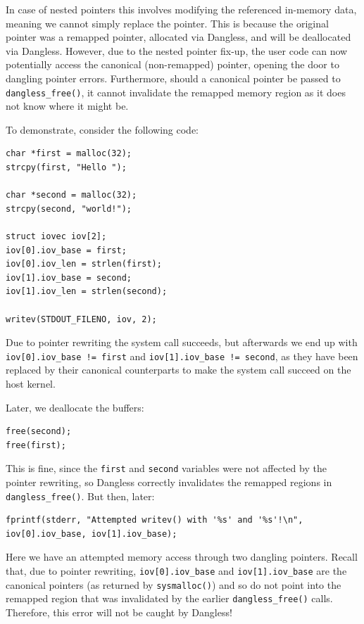 In case of nested pointers this involves modifying the referenced in-memory data, meaning we cannot simply replace the pointer. This is because the original pointer was a remapped pointer, allocated via Dangless, and will be deallocated via Dangless. However, due to the nested pointer fix-up, the user code can now potentially access the canonical (non-remapped) pointer, opening the door to dangling pointer errors. Furthermore, should a canonical pointer be passed to \lstinline!dangless_free()!, it cannot invalidate the remapped memory region as it does not know where it might be.

To demonstrate, consider the following code:

\begin{lstlisting}
char *first = malloc(32);
strcpy(first, "Hello ");

char *second = malloc(32);
strcpy(second, "world!");

struct iovec iov[2];
iov[0].iov_base = first;
iov[0].iov_len = strlen(first);
iov[1].iov_base = second;
iov[1].iov_len = strlen(second);

writev(STDOUT_FILENO, iov, 2);
\end{lstlisting}

Due to pointer rewriting the system call succeeds, but afterwards we end up with \lstinline|iov[0].iov_base != first| and \lstinline|iov[1].iov_base != second|, as they have been replaced by their canonical counterparts to make the system call succeed on the host kernel.

Later, we deallocate the buffers:

\begin{lstlisting}
free(second);
free(first);
\end{lstlisting}

This is fine, since the \lstinline!first! and \lstinline!second! variables were not affected by the pointer rewriting, so Dangless correctly invalidates the remapped regions in \lstinline!dangless_free()!. But then, later:

\begin{lstlisting}
fprintf(stderr, "Attempted writev() with '%s' and '%s'!\n", iov[0].iov_base, iov[1].iov_base);
\end{lstlisting}

Here we have an attempted memory access through two dangling pointers. Recall that, due to pointer rewriting, \lstinline|iov[0].iov_base| and \lstinline|iov[1].iov_base| are the canonical pointers (as returned by \lstinline!sysmalloc()!) and so do not point into the remapped region that was invalidated by the earlier \lstinline!dangless_free()! calls. Therefore, this error will not be caught by Dangless!

